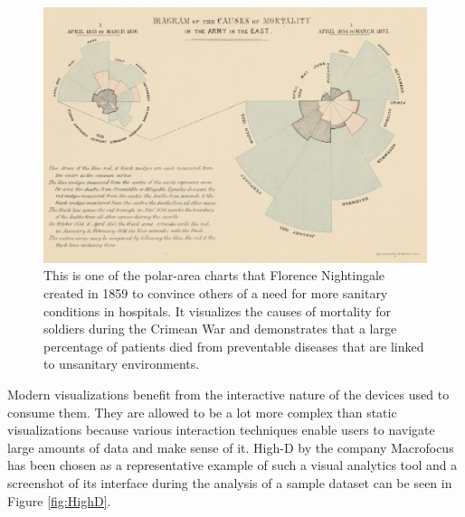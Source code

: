 \begin{figure}[tp]
    \centering
    \includegraphics[keepaspectratio,width=\linewidth,height=\fullh / 3]
    {images/nightingale.png}
    \caption[Polar-Area Chart by Florence Nightingale From 1859]{
        This is one of the polar-area charts that Florence Nightingale created in 1859 to convince others of a need for more sanitary conditions in hospitals. It visualizes the causes of mortality for soldiers during the Crimean War and demonstrates that a large percentage of patients died from preventable diseases that are linked to unsanitary environments.
    }
    \label{fig:NightingalePolarAreaChart}
\end{figure}

Modern visualizations benefit from the interactive nature of the devices used to consume them. They are allowed to be a lot more complex than static visualizations because various interaction techniques enable users to navigate large amounts of data and make sense of it. High-D by the company Macrofocus \parencite{HighD} has been chosen as a representative example of such a visual analytics tool and a screenshot of its interface during the analysis of a sample dataset can be seen in Figure \ref{fig:HighD}.

